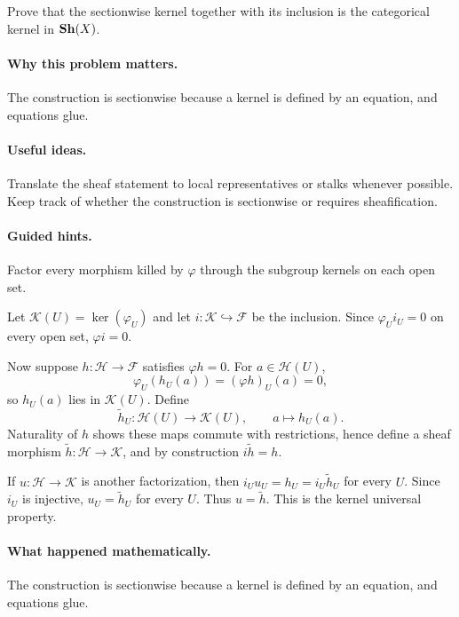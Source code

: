 \begin{problem}\label{prob:vi15-p3}
Prove that the sectionwise kernel together with its inclusion is the categorical kernel in $\mathbf{Sh}(X)$.
\end{problem}

\ifdefined\FullProblemDossiers
\paragraph{Why this problem matters.}
The construction is sectionwise because a kernel is defined by an equation, and equations glue.

\paragraph{Useful ideas.}
Translate the sheaf statement to local representatives or stalks whenever possible.  Keep track of whether the construction is sectionwise or requires sheafification.

\paragraph{Guided hints.}
Factor every morphism killed by $\varphi$ through the subgroup kernels on each open set.

\begin{solution}
Let $\mathcal K(U)=\ker(\varphi_U)$ and let $i:\mathcal K\hookrightarrow\mathcal F$ be the inclusion. Since $\varphi_U i_U=0$ on every open set, $\varphi i=0$.

Now suppose $h:\mathcal H\to\mathcal F$ satisfies $\varphi h=0$. For $a\in\mathcal H(U)$,
\[
\varphi_U(h_U(a))=(\varphi h)_U(a)=0,
\]
so $h_U(a)$ lies in $\mathcal K(U)$. Define
\[
\widetilde h_U:\mathcal H(U)\to\mathcal K(U),\qquad a\mapsto h_U(a).
\]
Naturality of $h$ shows these maps commute with restrictions, hence define a sheaf morphism $\widetilde h:\mathcal H\to\mathcal K$, and by construction $i\widetilde h=h$.

If $u:\mathcal H\to\mathcal K$ is another factorization, then $i_Uu_U=h_U=i_U\widetilde h_U$ for every $U$. Since $i_U$ is injective, $u_U=\widetilde h_U$ for every $U$. Thus $u=\widetilde h$. This is the kernel universal property.
\end{solution}

\paragraph{What happened mathematically.}
The construction is sectionwise because a kernel is defined by an equation, and equations glue.


